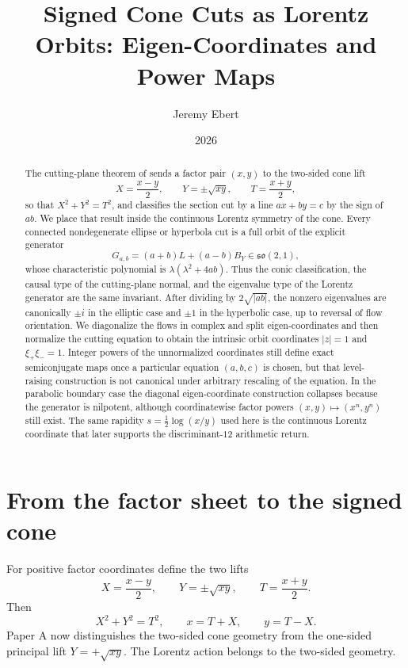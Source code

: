\documentclass[11pt]{amsart}
\title{Signed Cone Cuts as Lorentz Orbits: Eigen-Coordinates and Power Maps}
\author{Jeremy Ebert}
\date{2026}
\theoremstyle{remark}
\begin{document}
\begin{abstract}
The cutting-plane theorem of \cite{Ebert2026Table} sends a factor pair $(x,y)$ to the two-sided cone lift
\[
X=\frac{x-y}{2},\qquad Y=\pm\sqrt{xy},\qquad T=\frac{x+y}{2},
\]
so that $X^2+Y^2=T^2$, and classifies the section cut by a line $ax+by=c$ by the sign of $ab$.  We place that result inside the continuous Lorentz symmetry of the cone.  Every connected nondegenerate ellipse or hyperbola cut is a full orbit of the explicit generator
\[
G_{a,b}=(a+b)L+(a-b)B_Y\in\mathfrak{so}(2,1),
\]
whose characteristic polynomial is $\lambda(\lambda^2+4ab)$.  Thus the conic classification, the causal type of the cutting-plane normal, and the eigenvalue type of the Lorentz generator are the same invariant.  After dividing by $2\sqrt{|ab|}$, the nonzero eigenvalues are canonically $\pm i$ in the elliptic case and $\pm1$ in the hyperbolic case, up to reversal of flow orientation.  We diagonalize the flows in complex and split eigen-coordinates and then normalize the cutting equation to obtain the intrinsic orbit coordinates $|z|=1$ and $\xi_+\xi_-=1$.  Integer powers of the unnormalized coordinates still define exact semiconjugate maps once a particular equation $(a,b,c)$ is chosen, but that level-raising construction is not canonical under arbitrary rescaling of the equation.  In the parabolic boundary case the diagonal eigen-coordinate construction collapses because the generator is nilpotent, although coordinatewise factor powers $(x,y)\mapsto(x^n,y^n)$ still exist.  The same rapidity $s=\tfrac12\log(x/y)$ used here is the continuous Lorentz coordinate that later supports the discriminant-$12$ arithmetic return.
\end{abstract}

\maketitle

\section{From the factor sheet to the signed cone}

For positive factor coordinates define the two lifts
\begin{equation}\label{eq:mean}
X=\frac{x-y}{2},\qquad Y=\pm\sqrt{xy},\qquad T=\frac{x+y}{2}.
\end{equation}
Then
\begin{equation}\label{eq:cone}
X^2+Y^2=T^2,
\qquad
x=T+X,
\qquad
y=T-X.
\end{equation}
Paper A \cite{Ebert2026Table} now distinguishes the two-sided cone geometry from the one-sided principal lift $Y=+\sqrt{xy}$.  The Lorentz action belongs to the two-sided geometry.
\end{document}
